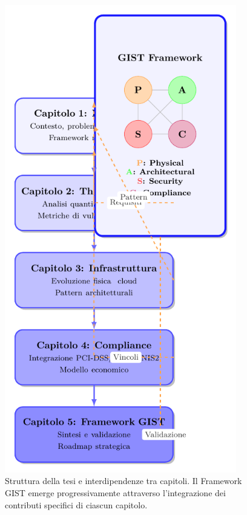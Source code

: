 \documentclass[12pt,a4paper,oneside]{book}
\begin{document}
\begin{figure}[htbp]
    \centering
    \includegraphics[width=0.9\textwidth]{figura 1-4}
\caption{Struttura della tesi e interdipendenze tra capitoli. Il Framework GIST emerge progressivamente attraverso l'integrazione dei contributi specifici di ciascun capitolo.}
\label{fig:struttura_tesi}
\end{figure}
\end{document}
